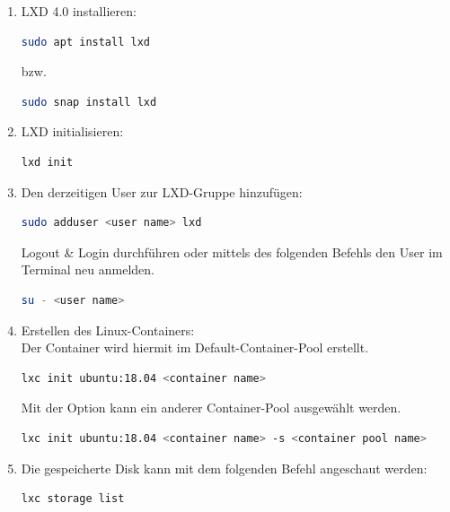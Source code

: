 \begin{enumerate}[label*=\arabic*.]
    \item LXD 4.0 installieren:\
        \begin{lstlisting}[language=bash]
sudo apt install lxd
        \end{lstlisting}
    bzw.
        \begin{lstlisting}[language=bash]
sudo snap install lxd
        \end{lstlisting}

    \item LXD initialisieren:\
        \begin{lstlisting}[language=bash]
lxd init
        \end{lstlisting}

    \item Den derzeitigen User zur LXD-Gruppe hinzufügen:\
        \begin{lstlisting}[language=bash]
sudo adduser <user name> lxd
        \end{lstlisting}
        Logout \& Login durchführen oder mittels des folgenden Befehls den User im Terminal neu anmelden.
        \begin{lstlisting}[language=bash]
su - <user name>
        \end{lstlisting}

    \item Erstellen des Linux-Containers:\\
        Der Container wird hiermit im Default-Container-Pool erstellt.
        \begin{lstlisting}[language=bash]
lxc init ubuntu:18.04 <container name>
        \end{lstlisting}
        Mit der Option \quoteMark{-s} kann ein anderer Container-Pool ausgewählt werden.
        \begin{lstlisting}[language=bash]
lxc init ubuntu:18.04 <container name> -s <container pool name>
        \end{lstlisting}

    \item Die gespeicherte Disk kann mit dem folgenden Befehl angeschaut werden:\
        \begin{lstlisting}[language=bash]
lxc storage list
        \end{lstlisting}


\end{enumerate}
